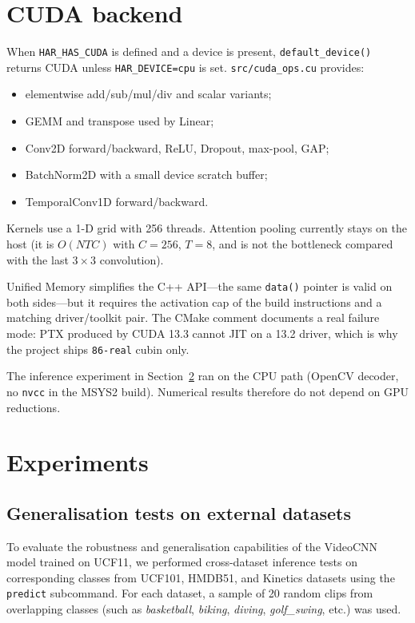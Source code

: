 \documentclass[11pt,a4paper]{article}
\begin{document}
\section{CUDA backend}
\label{sec:cuda}

When \texttt{HAR\_HAS\_CUDA} is defined and a device is present,
\texttt{default\_device()} returns CUDA unless \texttt{HAR\_DEVICE=cpu}
is set.
\texttt{src/cuda\_ops.cu} provides:
\begin{itemize}
  \item elementwise add/sub/mul/div and scalar variants;
  \item GEMM and transpose used by Linear;
  \item Conv2D forward/backward, ReLU, Dropout, max-pool, GAP;
  \item BatchNorm2D with a small device scratch buffer;
  \item TemporalConv1D forward/backward.
\end{itemize}
Kernels use a 1-D grid with 256 threads.
Attention pooling currently stays on the host (it is $O(NTC)$ with
$C=256$, $T=8$, and is not the bottleneck compared with the last
$3\times 3$ convolution).

Unified Memory simplifies the C++ API---the same \texttt{data()} pointer
is valid on both sides---but it requires the activation cap of
the build instructions and a matching driver/toolkit pair.
The CMake comment documents a real failure mode: PTX produced by CUDA
13.3 cannot JIT on a 13.2 driver, which is why the project ships
\texttt{86-real} cubin only.

The inference experiment in Section~\ref{sec:exp} ran on the CPU path
(OpenCV decoder, no \texttt{nvcc} in the MSYS2 build).
Numerical results therefore do not depend on GPU reductions.

\section{Experiments}
\label{sec:exp}

\subsection{Generalisation tests on external datasets}
\label{sec:exp_gen}

To evaluate the robustness and generalisation capabilities of the VideoCNN model trained on UCF11, we performed cross-dataset inference tests on corresponding classes from UCF101, HMDB51, and Kinetics datasets using the \texttt{predict} subcommand. For each dataset, a sample of 20 random clips from overlapping classes (such as \emph{basketball}, \emph{biking}, \emph{diving}, \emph{golf\_swing}, etc.) was used.
\end{document}
